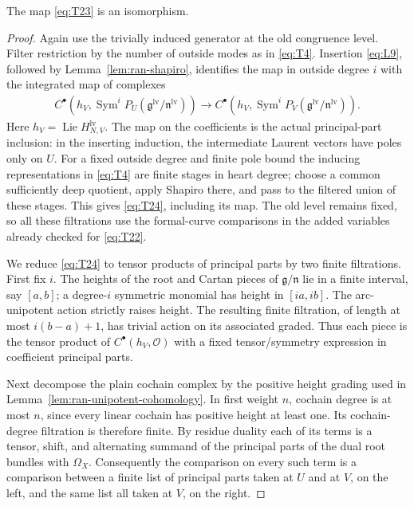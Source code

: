\begin{lemma}\label{lem:ran-two-insertions}
The map \eqref{eq:T23} is an isomorphism.
\end{lemma}

\begin{proof}
Again use the trivially induced generator at the old congruence level.
Filter restriction by the number of outside modes as in \eqref{eq:T4}.
Insertion \eqref{eq:L9}, followed by Lemma~\ref{lem:ran-shapiro}, identifies
the map in outside degree $i$ with the integrated map of complexes
\begin{equation}\label{eq:T24}
\begin{aligned}
 C^\bullet\!\left(h_V,
       \operatorname{Sym}^{i}P_U
          (\mathfrak g^{\mathrm{lv}}/\mathfrak n^{\mathrm{lv}})\right)
 \longrightarrow
 C^\bullet\!\left(h_V,
       \operatorname{Sym}^{i}P_V
          (\mathfrak g^{\mathrm{lv}}/\mathfrak n^{\mathrm{lv}})\right).
\end{aligned}
\end{equation}
Here $h_V=\operatorname{Lie}H_{N,V}^{\mathrm{lv}}$.  The map on the
coefficients is the actual principal-part inclusion: in the inserting
induction, the intermediate Laurent vectors have poles only on $U$.
For a fixed outside degree and finite pole bound the inducing
representations in \eqref{eq:T4} are finite stages in heart degree; choose
a common sufficiently deep quotient, apply Shapiro there, and pass to the
filtered union of these stages.  This gives \eqref{eq:T24}, including its
map.  The old level remains fixed, so all these filtrations use the
formal-curve comparisons in the added variables already checked for
\eqref{eq:T22}.

We reduce \eqref{eq:T24} to tensor products of principal parts by two
finite filtrations.  First fix $i$.  The heights of the root and Cartan
pieces of $\mathfrak g/\mathfrak n$ lie in a finite interval, say
$[a,b]$; a degree-$i$ symmetric monomial has height in $[ia,ib]$.
The arc-unipotent action strictly raises height.  The resulting finite
filtration, of length at most $i(b-a)+1$, has trivial action on its
associated graded.  Thus each piece is the tensor product of
$C^\bullet(h_V,\mathcal O)$ with a fixed tensor/symmetry expression in
coefficient principal parts.

Next decompose the plain cochain complex by the positive height grading
used in Lemma~\ref{lem:ran-unipotent-cohomology}.  In first weight $n$,
cochain degree is at most $n$, since every linear cochain has positive
height at least one.  Its cochain-degree filtration is therefore finite.
By residue duality each of its terms is a tensor, shift, and alternating
summand of the principal parts of the dual root bundles with
$\Omega_X$.  Consequently the comparison on every such term is a
comparison between a finite list of principal parts taken at $U$ and at
$V$, on the left, and the same list all taken at $V$, on the right.


\end{proof}
